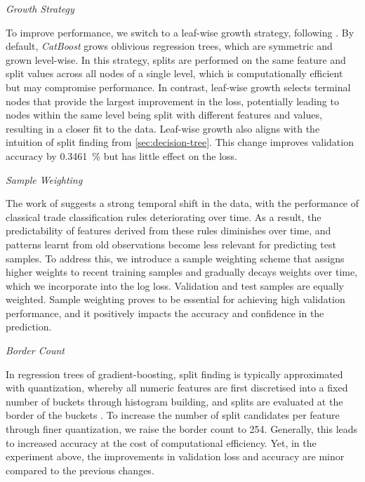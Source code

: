 \emph{Growth Strategy}

To improve performance, we switch to a leaf-wise growth strategy, following \textcite[][4]{chenXGBoostScalableTree2016}. By default, \emph{CatBoost} grows oblivious regression trees, which are symmetric and grown level-wise. In this strategy, splits are performed on the same feature and split values across all nodes of a single level, which is computationally efficient but may compromise performance. In contrast, leaf-wise growth selects terminal nodes that provide the largest improvement in the loss, potentially leading to nodes within the same level being split with different features and values, resulting in a closer fit to the data. Leaf-wise growth also aligns with the intuition of split finding from \cref{sec:decision-tree}. This change improves validation accuracy by \SI{0.3461}{\percent} but has little effect on the loss.

\emph{Sample Weighting}

The work of \textcite[][36--38]{grauerOptionTradeClassification2022} suggests a strong temporal shift in the data, with the performance of classical trade classification rules deteriorating over time.  As a result, the predictability of features derived from these rules diminishes over time, and patterns learnt from old observations become less relevant for predicting test samples. To address this, we introduce a sample weighting scheme that assigns higher weights to recent training samples and gradually decays weights over time, which we incorporate into the log loss. Validation and test samples are equally weighted. Sample weighting proves to be essential for achieving high validation performance, and it positively impacts the accuracy and confidence in the prediction.

\emph{Border Count}

In regression trees of gradient-boosting, split finding is typically approximated with quantization, whereby all numeric features are first discretised into a fixed number of buckets through histogram building, and splits are evaluated at the border of the buckets \autocites[][4]{dorogushCatBoostGradientBoosting}[][2]{keLightGBMHighlyEfficient2017}. To increase the number of split candidates per feature through finer quantization, we raise the border count to \num{254}. Generally, this leads to increased accuracy at the cost of computational efficiency. Yet, in the experiment above, the improvements in validation loss and accuracy are minor compared to the previous changes.

